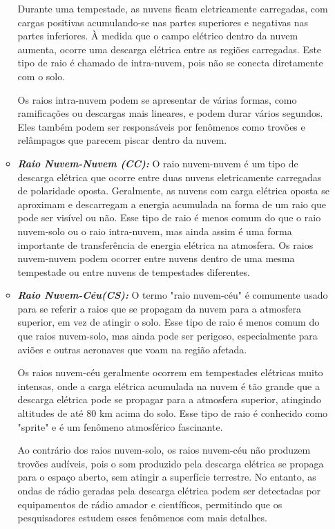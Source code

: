 \documentclass[a4paper, 12pt, onecolumn,singlespacing]{article}
\begin{document}
\begin{itemize}
\begin{itemize}
			Durante uma tempestade, as nuvens ficam eletricamente carregadas, com cargas positivas acumulando-se nas partes superiores e negativas nas partes inferiores. À medida que o campo elétrico dentro da nuvem aumenta, ocorre uma descarga elétrica entre as regiões carregadas. Este tipo de raio é chamado de intra-nuvem, pois não se conecta diretamente com o solo.
			
			Os raios intra-nuvem podem se apresentar de várias formas, como ramificações ou descargas mais lineares, e podem durar vários segundos. Eles também podem ser responsáveis por fenômenos como trovões e relâmpagos que parecem piscar dentro da nuvem.
			
			\item \textbf{\textit{Raio Nuvem-Nuvem (CC): }}O raio nuvem-nuvem é um tipo de descarga elétrica que ocorre entre duas nuvens eletricamente carregadas de polaridade oposta. Geralmente, as nuvens com carga elétrica oposta se aproximam e descarregam a energia acumulada na forma de um raio que pode ser visível ou não. Esse tipo de raio é menos comum do que o raio nuvem-solo ou o raio intra-nuvem, mas ainda assim é uma forma importante de transferência de energia elétrica na atmosfera. Os raios nuvem-nuvem podem ocorrer entre nuvens dentro de uma mesma tempestade ou entre nuvens de tempestades diferentes.
			
			\item \textbf{\textit{Raio Nuvem-Céu(CS): }}O termo "raio nuvem-céu" é comumente usado para se referir a raios que se propagam da nuvem para a atmosfera superior, em vez de atingir o solo. Esse tipo de raio é menos comum do que raios nuvem-solo, mas ainda pode ser perigoso, especialmente para aviões e outras aeronaves que voam na região afetada.
			
			Os raios nuvem-céu geralmente ocorrem em tempestades elétricas muito intensas, onde a carga elétrica acumulada na nuvem é tão grande que a descarga elétrica pode se propagar para a atmosfera superior, atingindo altitudes de até 80 km acima do solo. Esse tipo de raio é conhecido como "sprite" e é um fenômeno atmosférico fascinante.
			
			Ao contrário dos raios nuvem-solo, os raios nuvem-céu não produzem trovões audíveis, pois o som produzido pela descarga elétrica se propaga para o espaço aberto, sem atingir a superfície terrestre. No entanto, as ondas de rádio geradas pela descarga elétrica podem ser detectadas por equipamentos de rádio amador e científicos, permitindo que os pesquisadores estudem esses fenômenos com mais detalhes.
			

\end{itemize}
\end{itemize}
\end{document}
